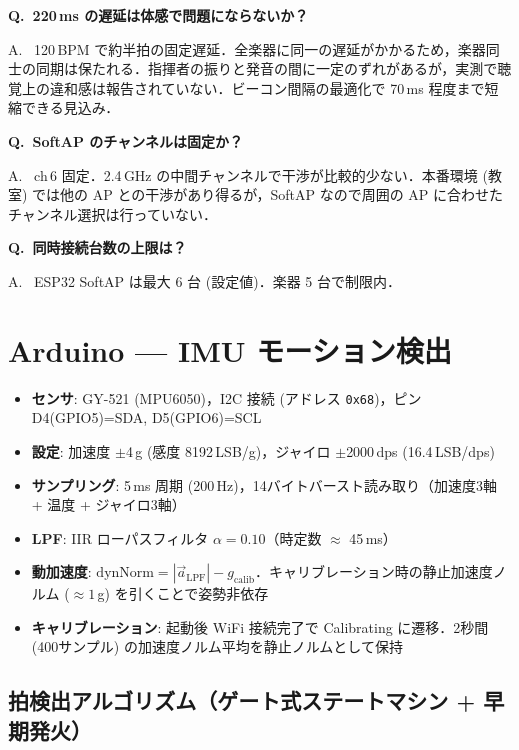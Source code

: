 \documentclass[uplatex,dvipdfmx,a4paper,10pt]{jsarticle}
\newcommand{\QA}[2]{%
  \par\noindent\textbf{\textcolor{qcolor}{Q.~#1}}%
  \par\noindent\textcolor{acolor}{A.~#2}\medskip%
}
\begin{document}
\QA{220\,ms の遅延は体感で問題にならないか？}{
120\,BPM で約半拍の固定遅延．全楽器に同一の遅延がかかるため，楽器同士の同期は保たれる．指揮者の振りと発音の間に一定のずれがあるが，実測で聴覚上の違和感は報告されていない．ビーコン間隔の最適化で 70\,ms 程度まで短縮できる見込み．}

\QA{SoftAP のチャンネルは固定か？}{
ch\,6 固定．2.4\,GHz の中間チャンネルで干渉が比較的少ない．本番環境 (教室) では他の AP との干渉があり得るが，SoftAP なので周囲の AP に合わせたチャンネル選択は行っていない．}

\QA{同時接続台数の上限は？}{
ESP32 SoftAP は最大 6 台 (設定値)．楽器 5 台で制限内．}

\section{Arduino — IMU モーション検出}

\begin{tcolorbox}[cheatbox, title=実装要点]
\begin{itemize}
  \item \textbf{センサ}: GY-521 (MPU6050)，I2C 接続 (アドレス \texttt{0x68})，ピン D4(GPIO5)=SDA, D5(GPIO6)=SCL
  \item \textbf{設定}: 加速度 $\pm$4\,g (感度 8192\,LSB/g)，ジャイロ $\pm$2000\,dps (16.4\,LSB/dps)
  \item \textbf{サンプリング}: 5\,ms 周期 (200\,Hz)，14バイトバースト読み取り（加速度3軸 + 温度 + ジャイロ3軸）
  \item \textbf{LPF}: IIR ローパスフィルタ $\alpha = 0.10$（時定数 $\approx$ 45\,ms）
  \item \textbf{動加速度}: $\text{dynNorm} = |\vec{a}_\text{LPF}| - g_\text{calib}$．キャリブレーション時の静止加速度ノルム ($\approx 1$\,g) を引くことで姿勢非依存
  \item \textbf{キャリブレーション}: 起動後 WiFi 接続完了で Calibrating に遷移．2秒間 (400サンプル) の加速度ノルム平均を静止ノルムとして保持
\end{itemize}
\end{tcolorbox}

\subsection{拍検出アルゴリズム（ゲート式ステートマシン + 早期発火）}
\end{document}

